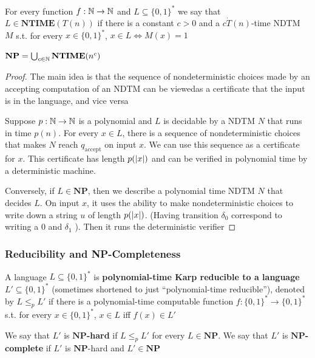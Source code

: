 \documentclass[11pt]{article}
\def \NTIME {\textbf{NTIME}}
\def \NP {\textbf{NP}}
\def \NP {\textbf{NP}}
\def \accept {\text{accept}}
\begin{document}
\begin{definition}[]
For every function \(f:\mathbb{N}\to\mathbb{N}\) and \(L\subseteq\{0,1\}^*\) we say that \(L\in\NTIME(T(n))\)
if there is a constant \(c>0\) and a \(c\dot T(n)\)-time NDTM \(M\) s.t. for
every \(x\in\{0,1\}^*\), \(x\in L\Leftrightarrow M(x)=1\)
\end{definition}

\begin{theorem}[]
\(\NP=\bigcup_{c\in\N}\NTIME(n^c)\)
\end{theorem}

\begin{proof}
The main idea is that the sequence of nondeterministic choices made by an accepting computation
of an NDTM can be viewedas a certificate that the input is in the language, and vice versa

Suppose \(p:\mathbb{N}\to\mathbb{N}\) is a polynomial and \(L\) is decidable by a NDTM \(N\) that runs in
time \(p(n)\). For every \(x\in L\), there is a sequence of nondeterministic choices that
makes \(N\) reach \(q_{\accept}\) on input \(x\). We can use this sequence as a certificate
for \(x\). This certificate has length \(p(\abs{x})\) and can be verified in polynomial time by
a deterministic machine.

Conversely, if \(L\in\NP\), then we describe a polynomial time NDTM \(N\) that decides \(L\).
On input \(x\), it uses the ability to make nondeterministic choices to write down a
string \(u\) of length \(p(\abs{x})\). (Having transition \(\delta_0\) correspond to writing a
0 and \(\delta_1\) ). Then it runs the deterministic verifier
\end{proof}

\subsubsection{Reducibility and NP-Completeness}
\label{sec:org5c65f89}
\begin{definition}[]
A language \(L\subseteq\{0,1\}^*\) is \textbf{polynomial-time Karp reducible to a
language} \(L'\subseteq\{0,1\}^*\) (sometimes shortened to just ``polynomial-time reducible''), denoted
by \(L\le_p L'\) if there is a polynomial-time
computable function \(f:\{0,1\}^*\to\{0,1\}^*\) s.t. for every \(x\in\{0,1\}^*\),
\(x\in L\) iff \(f(x)\in L'\)

We say that \(L'\) is \textbf{\(\NP\)-hard} if \(L\le_pL'\) for every \(L\in\NP\). We say that \(L'\)
is \textbf{\(\NP\)-complete} if \(L'\) is \(\NP\)-hard and \(L'\in\NP\)
\end{definition}
\end{document}
